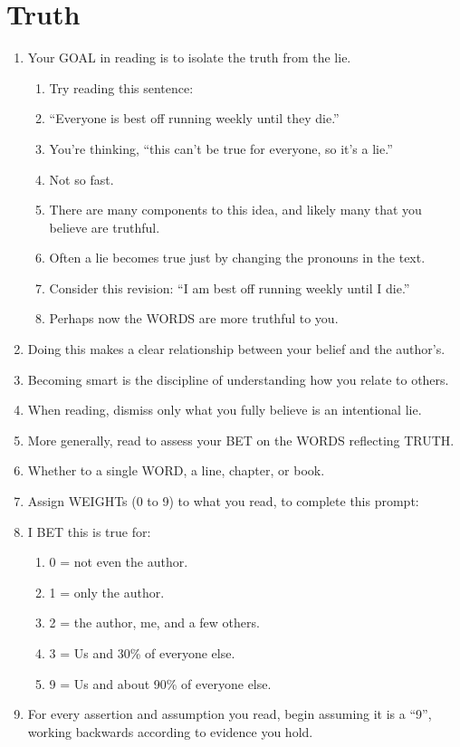 \documentclass[
]{book}
\providecommand{\tightlist}{%
  \setlength{\itemsep}{0pt}\setlength{\parskip}{0pt}}
\begin{document}
\hypertarget{truth}{%
\section{Truth}\label{truth}}

\begin{enumerate}
\def\labelenumi{\arabic{enumi}.}
\setcounter{enumi}{54}
\tightlist
\item
  Your GOAL in reading is to isolate the truth from the lie.

  \begin{enumerate}
  \def\labelenumii{\arabic{enumii}.}
  \tightlist
  \item
    Try reading this sentence:
  \item
    ``Everyone is best off running weekly until they die.''
  \item
    You're thinking, ``this can't be true for everyone, so it's a
    lie.''
  \item
    Not so fast.
  \item
    There are many components to this idea, and likely many that you
    believe are truthful.
  \item
    Often a lie becomes true just by changing the pronouns in the
    text.
  \item
    Consider this revision: ``I am best off running weekly until I
    die.''
  \item
    Perhaps now the WORDS are more truthful to you.
  \end{enumerate}
\item
  Doing this makes a clear relationship between your belief and the
  author's.
\item
  Becoming smart is the discipline of understanding how you relate to
  others.
\item
  When reading, dismiss only what you fully believe is an intentional
  lie.
\item
  More generally, read to assess your BET on the WORDS reflecting
  TRUTH.
\item
  Whether to a single WORD, a line, chapter, or book.
\item
  Assign WEIGHTs (0 to 9) to what you read, to complete this prompt:
\item
  I BET this is true for:

  \begin{enumerate}
  \def\labelenumii{\arabic{enumii}.}
  \tightlist
  \item
    0 = not even the author.
  \item
    1 = only the author.
  \item
    2 = the author, me, and a few others.
  \item
    3 = Us and 30\% of everyone else.
  \item
    9 = Us and about 90\% of everyone else.
  \end{enumerate}
\item
  For every assertion and assumption you read, begin assuming it is a
  ``9'', working backwards according to evidence you hold.
\end{enumerate}
\end{document}
